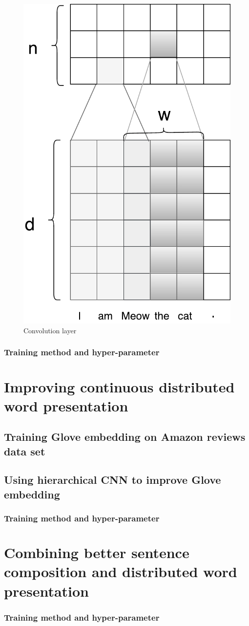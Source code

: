 \begin{figure}[H]
	\centering
	\includegraphics[width=0.8\linewidth]{figure/convlayer}
	\caption[Convolution layer]{Convolution layer}
	\label{fig:convlayer}
\end{figure}

\subsubsection{Training method and hyper-parameter}





\section{Improving continuous distributed word presentation}

\subsection{Training Glove embedding on Amazon reviews data set}

\subsection{Using hierarchical CNN to improve Glove embedding}

\subsubsection{Training method and hyper-parameter}


\section{Combining better sentence composition and distributed word presentation}

\subsubsection{Training method and hyper-parameter}
